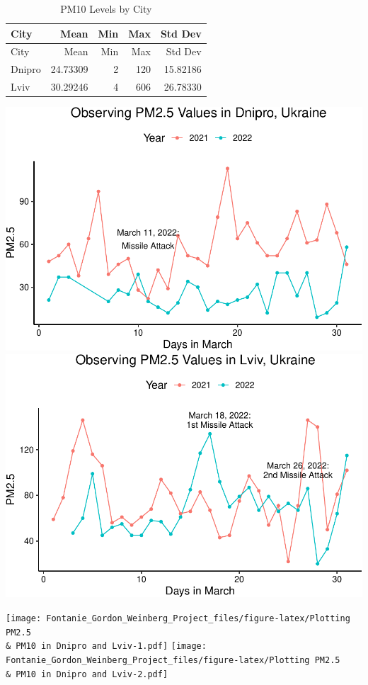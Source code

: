 \documentclass[
  12pt,
]{article}
\begin{document}
\begin{longtable}[]{@{}lrrrr@{}}
\caption{PM10 Levels by City}\tabularnewline
\toprule
City & Mean & Min & Max & Std Dev \\
\midrule
\endfirsthead
\toprule
City & Mean & Min & Max & Std Dev \\
\midrule
\endhead
Dnipro & 24.73309 & 2 & 120 & 15.82186 \\
Lviv & 30.29246 & 4 & 606 & 26.78330 \\
\bottomrule
\end{longtable}

\includegraphics{Fontanie_Gordon_Weinberg_Project_files/figure-latex/Plotting.PM25-1.pdf}
\includegraphics{Fontanie_Gordon_Weinberg_Project_files/figure-latex/Plotting.PM25-2.pdf}

\texttt{[image: Fontanie\_Gordon\_Weinberg\_Project\_files/figure-latex/Plotting PM2.5 \\\& PM10 in Dnipro and Lviv-1.pdf]}
\texttt{[image: Fontanie\_Gordon\_Weinberg\_Project\_files/figure-latex/Plotting PM2.5 \\\& PM10 in Dnipro and Lviv-2.pdf]}
\end{document}

